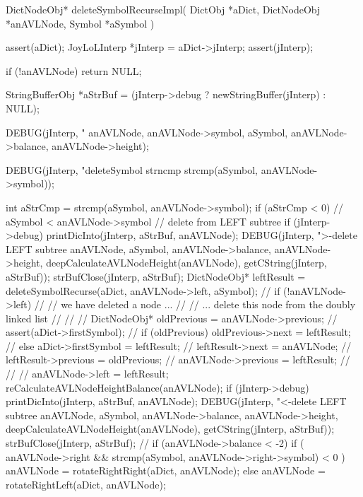 \startCCode
DictNodeObj* deleteSymbolRecurseImpl(
  DictObj     *aDict,
  DictNodeObj *anAVLNode,
  Symbol      *aSymbol
) {
  assert(aDict);
  JoyLoLInterp *jInterp = aDict->jInterp;
  assert(jInterp);
  
  if (!anAVLNode) return NULL;

  StringBufferObj *aStrBuf = 
    (jInterp->debug ? newStringBuffer(jInterp) : NULL);

  DEBUG(jInterp, "\ndeleteSymbol %
        anAVLNode, anAVLNode->symbol, aSymbol,
        anAVLNode->balance, anAVLNode->height);

  DEBUG(jInterp, "deleteSymbol strncmp %
        strcmp(aSymbol, anAVLNode->symbol));

  int aStrCmp = strcmp(aSymbol, anAVLNode->symbol);
  if (aStrCmp < 0) {
    // aSymbol < anAVLNode->symbol // delete from LEFT subtree
    if (jInterp->debug) {
      printDicInto(jInterp, aStrBuf, anAVLNode);
      DEBUG(jInterp, ">-delete LEFT subtree %
            anAVLNode, aSymbol, anAVLNode->balance,
            anAVLNode->height, deepCalculateAVLNodeHeight(anAVLNode),
            getCString(jInterp, aStrBuf));
      strBufClose(jInterp, aStrBuf);
    }
    DictNodeObj* leftResult =
      deleteSymbolRecurse(aDict, anAVLNode->left, aSymbol);
//    if (!anAVLNode->left) {
//      // we have deleted a node ...
//      // ... delete this node from the doubly linked list
//      //
//      DictNodeObj* oldPrevious           = anAVLNode->previous;
//      assert(aDict->firstSymbol);
//      if (oldPrevious) oldPrevious->next = leftResult;
//      else aDict->firstSymbol            = leftResult;
//      leftResult->next                   = anAVLNode;
//      leftResult->previous               = oldPrevious;
//      anAVLNode->previous                = leftResult;
//      //
//    }
    anAVLNode->left = leftResult;
    reCalculateAVLNodeHeightBalance(anAVLNode);
    if (jInterp->debug) {
      printDicInto(jInterp, aStrBuf, anAVLNode);
      DEBUG(jInterp, "<-delete LEFT subtree %
          anAVLNode, aSymbol, anAVLNode->balance,
          anAVLNode->height, deepCalculateAVLNodeHeight(anAVLNode),
          getCString(jInterp, aStrBuf));
      strBufClose(jInterp, aStrBuf);
    }
    //
    if (anAVLNode->balance < -2) {
      if (
        anAVLNode->right && 
        strcmp(aSymbol, anAVLNode->right->symbol) < 0
      ) {
        anAVLNode = rotateRightRight(aDict, anAVLNode);
      } else {
        anAVLNode = rotateRightLeft(aDict, anAVLNode);
      }
}}}
